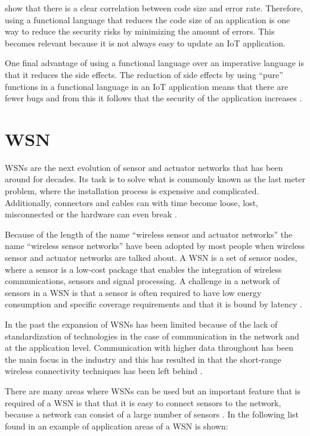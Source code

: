 \citet{ray2014large} show that there is a clear correlation between code size and error rate. Therefore, using a functional language that reduces the code size of an application is one way to reduce the security risks by minimizing the amount of errors. This becomes relevant because it is not always easy to update an IoT application.

One final advantage of using a functional language over an imperative language is that it reduces the side effects. The reduction of side effects by using “pure” functions in a functional language in an IoT application means that there are fewer bugs and from this it follows that the security of the application increases \citep{haenisch2016case}.

\section{WSN}
WSNs are the next evolution of sensor and actuator networks that has been around for decades. Its task is to solve what is commonly known as the last meter problem, where the installation process is expensive and complicated. Additionally, connectors and cables can with time become loose, lost, misconnected or the hardware can even break \citep{yang2014internet}. 

Because of the length of the name “wireless sensor and actuator networks” the name “wireless sensor networks” have been adopted by most people when wireless sensor and actuator networks are talked about.  A WSN is a set of sensor nodes, where a sensor is a low-cost package that enables the integration of wireless communications, sensors and signal processing. A challenge in a network of sensors in a WSN is that a sensor is often required to have low energy consumption and specific coverage requirements and that it is bound by latency \citep{essameldindevice, yang2014internet}.

In the past the expansion of WSNs has been limited because of the lack of standardization of technologies in the case of communication in the network and at the application level. Communication with higher data throughout has been the main focus in the industry and this has resulted in that the short-range wireless connectivity techniques has been left behind \citep{gutierrez2004low}.

There are many areas where WSNs can be used but an important feature that is required of a WSN is that that it is easy to connect sensors to the network, because a network can consist of a large number of sensors \citep{gutierrez2004low}. In the following list found in \citet{yang2014internet} an example of application areas of a WSN is shown:

